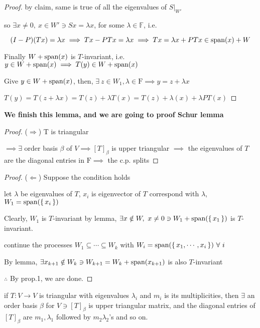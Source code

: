 \begin{proof}
	 by claim, same is true of all the eigenvalues of $S|_{W'}$
	 
	 so $\exists x \neq 0,~x \in W' \ni Sx = \lambda x$, for some $\lambda \in \mathbb F$, i.e.
	 
	 $$(I-P)(Tx) = \lambda x \implies Tx - PTx = \lambda x \implies Tx = \lambda x + PTx \in \text{span($x$)}+W$$
	 
	 Finally $W + \text{span($x$)}$ is $T$-invariant, i.e. $y \in W + \text{span($x$)} \implies T(y) \in W + \text{span($x$)}$
	 
	 Give $y \in W + \text{span($x$)}$, then, $\exists~z \in W_1,\lambda \in \mathrm F \implies y = z + \lambda x$
	 
	 $T(y) = T(z+\lambda x) = T(z) + \lambda T(x) = T(z) + \lambda(x)+\lambda PT(x)$
\end{proof}

\textbf{We finish this lemma, and we are going to proof Schur lemma}

\begin{proof}($\Rightarrow$) T is triangular

$\implies \exists$ order basis $\beta$ of $V \implies [T]_{\beta}$ is upper triangular $\implies$ the eigenvalues of $T$ are the diagonal entries in $\mathrm F \implies$ the c.p. splits  
	
\end{proof}

\newpage

\begin{proof}($\Leftarrow$) Suppose the condition holds

let $\lambda$ be eigenvalues of $T$, $x_i$ is eigenvector of $T$ correspond with $\lambda$, $W_1 = \text{span($\left\{ \,x_i \,\right\}$)}$

Clearly, $W_1$ is $T$-invariant by lemma, $\exists x \notin W,~ x \neq 0 \ni W_1 + \text{span($\left\{ \,x_1 \,\right\}$)}$ is $T$-invariant.

continue the processes $W_1 \subseteq \cdots \subseteq W_k$ with $W_i = \text{span($\left\{ \,x_1,\cdots,x_i \,\right\}$)} ~\forall~ i$

By lemma, $\exists x_{k+1} \notin W_k \ni W_{k+1} = W_k + \text{span($x_{k+1}$)}$ is also $T$-invariant

$\therefore$ By prop.1, we are done. 
	
\end{proof}

\begin{cor*}
	if $T:V\rightarrow V$ is triangular with eigenvalues $\lambda_i$ and $m_i$ is its multiplicities, then $\exists$ an order basis $\beta$ for $V \ni [T]_{\beta}$ is upper triangular matrix, and the diagonal entries of $[T]_{\beta}$ are $m_1,\lambda_1$ followed by $m_2 \lambda_2$'s and so on.
\end{cor*}

